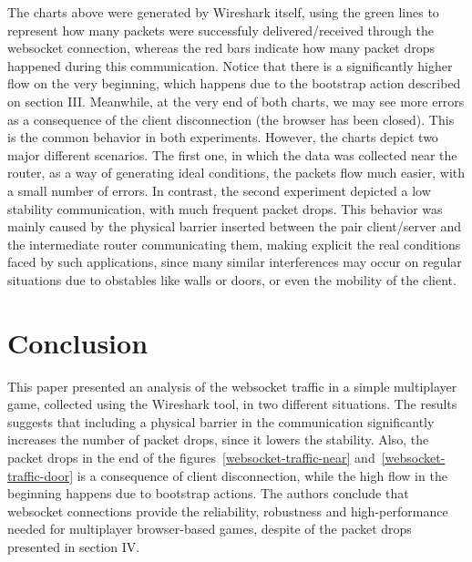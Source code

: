 \documentclass[english]{sbrt}
\begin{document}
The charts above were generated by Wireshark itself, using the green lines to represent
how many packets were successfuly delivered/received through the websocket connection, whereas the
red bars indicate how many packet drops happened during this communication. Notice that there is a significantly
higher flow on the very beginning, which happens due to the bootstrap action described on section III. Meanwhile, at the very end
of both charts, we may see more errors as a consequence of the client disconnection (the browser has been closed). This is the common
behavior in both experiments. However, the charts depict two major different scenarios. The first one, in which the data was collected near
the router, as a way of generating ideal conditions, the packets flow much easier, with a small number of errors. In contrast, the second experiment
depicted a low stability communication, with much frequent packet drops. This behavior was mainly caused by the physical barrier inserted between the pair client/server
and the intermediate router communicating them, making explicit the real conditions faced by such applications, since many similar interferences may occur on regular situations
due to obstables like walls or doors, or even the mobility of the client.

\section{\textbf{Conclusion}}
This paper presented an analysis of the websocket traffic in a simple multiplayer game, collected using the Wireshark tool, in two different situations. The results suggests that including a physical barrier in the communication significantly increases the number of packet drops, since it lowers the stability. Also, the packet drops in the end of the figures~\ref{websocket-traffic-near} and~\ref{websocket-traffic-door} is a consequence of client disconnection, while the high flow in the beginning happens due to bootstrap actions. The authors conclude that websocket connections provide the reliability, robustness and high-performance needed for multiplayer browser-based games, despite of the packet drops presented in section IV.



\end{document}

